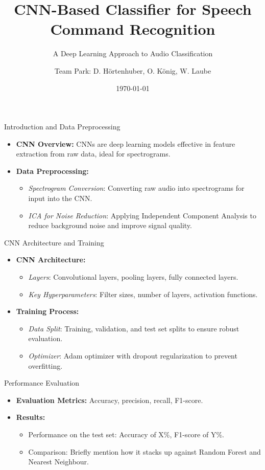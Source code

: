 \documentclass{beamer}
\title{CNN-Based Classifier for Speech Command Recognition}
\subtitle{A Deep Learning Approach to Audio Classification}
\author{Team Park: D. Hörtenhuber, O. König, W. Laube}
\institute{JKU \\ MLPC}
\date{\today}
\begin{document}
\begin{frame}
  \titlepage
\end{frame}

\begin{frame}{Introduction and Data Preprocessing}
  \begin{itemize}
    \item \textbf{CNN Overview:} CNNs are deep learning models effective in feature extraction from raw data, ideal for spectrograms.
    \item \textbf{Data Preprocessing:}
      \begin{itemize}
        \item \textit{Spectrogram Conversion}: Converting raw audio into spectrograms for input into the CNN.
        \item \textit{ICA for Noise Reduction}: Applying Independent Component Analysis to reduce background noise and improve signal quality.
      \end{itemize}
  \end{itemize}
\end{frame}

\begin{frame}{CNN Architecture and Training}
  \begin{itemize}
    \item \textbf{CNN Architecture:}
      \begin{itemize}
        \item \textit{Layers}: Convolutional layers, pooling layers, fully connected layers.
        \item \textit{Key Hyperparameters}: Filter sizes, number of layers, activation functions.
      \end{itemize}
    \item \textbf{Training Process:}
      \begin{itemize}
        \item \textit{Data Split}: Training, validation, and test set splits to ensure robust evaluation.
        \item \textit{Optimizer}: Adam optimizer with dropout regularization to prevent overfitting.
      \end{itemize}
  \end{itemize}
\end{frame}

\begin{frame}{Performance Evaluation}
  \begin{itemize}
    \item \textbf{Evaluation Metrics:} Accuracy, precision, recall, F1-score.
    \item \textbf{Results:}
      \begin{itemize}
        \item Performance on the test set: Accuracy of X\%, F1-score of Y\%.
        \item Comparison: Briefly mention how it stacks up against Random Forest and Nearest Neighbour.
      \end{itemize}
  \end{itemize}
\end{frame}
\end{document}
